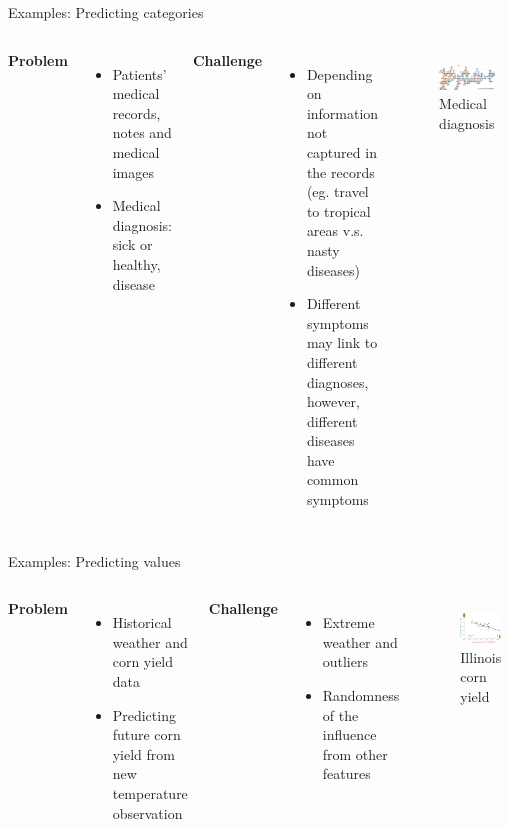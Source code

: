 \documentclass{beamer}
\begin{document}
\begin{frame}{Examples: Predicting categories}
\begin{columns}
\textbf{Problem}
\begin{itemize}
\item Patients' medical records, notes and medical images
\item Medical diagnosis: sick or healthy, disease 
\end{itemize}
\vspace{6pt}
\textbf{Challenge}
\begin{itemize}
\item Depending on information not captured in the records (eg. travel to tropical areas v.s. nasty diseases)
\item Different symptoms may link to different diagnoses, however, different diseases have common symptoms
\end{itemize}
\begin{figure}
\centering
\includegraphics[width=3cm]{ep6.jpeg}
{\tiny Medical diagnosis}
\end{figure}
\end{columns}
\end{frame}

\begin{frame}{Examples: Predicting values}
\begin{columns}
\textbf{Problem}
\begin{itemize}
\item Historical weather and corn yield data
\item Predicting future corn yield from new temperature observation 
\end{itemize}
\vspace{6pt}
\textbf{Challenge}
\begin{itemize}
\item Extreme weather and outliers
\item Randomness of the influence from other features 
\end{itemize}
\begin{figure}
\centering
\includegraphics[width=3cm]{ep7.png}
{\tiny Illinois corn yield}
\end{figure}
\end{columns}
\end{frame}
\end{document}
